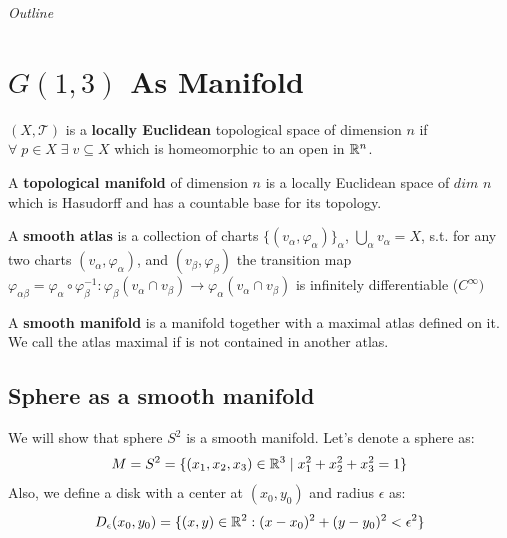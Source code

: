 \documentclass[11pt,a4paper]{report}
\begin{document}
\textit{Outline} \newline







\chapter{$G(1,3)$ As Manifold}
\begin{defn}
     $(X,\mathcal{T})$ is a \textbf{locally Euclidean} topological space of dimension $n$  if $\forall \; p \in X \; \exists \; v \subseteq X$ which is homeomorphic to an open in $\mathbb{R}^n$.
\end{defn}
\begin{defn}
      A \textbf{topological manifold} of dimension $n$ is a locally Euclidean space of $dim$ $n$ which is Hasudorff and has a countable base for its topology.
\end{defn}
\begin{defn}
      A \textbf{smooth atlas} is a collection of charts $\{ (v_{\alpha}, \varphi_{\alpha}) \}_{\alpha}$, $\bigcup_{\alpha} v_{\alpha} = X$, s.t. for any two charts $(v_{\alpha} , \varphi_{\alpha})$, and $(v_{\beta} , \varphi_{\beta})$
      the transition map $\varphi_{\alpha \beta} = \varphi_{\alpha} \circ \varphi_{\beta}^{-1} : \varphi_{\beta}(v_{\alpha} \cap v_{\beta}) \to \varphi_{\alpha}(v_{\alpha} \cap v_{\beta})$ is infinitely differentiable ($C^{\infty})$
\end{defn}
\begin{defn}
  A \textbf{smooth manifold} is a manifold together with a maximal atlas defined on it. We call the atlas maximal if is not contained in another atlas.
\end{defn}
\section{Sphere as a smooth manifold}
We will show that sphere $S^2$ is a smooth manifold. Let's denote a sphere as:
\begin{equation} \label{s2}
 M = S^2 = \{(x_1,x_2,x_3) \in \mathbb{R}^3 \mid x_1^2 + x_2^2 + x_3^2 = 1 \} 
\end{equation}
Also, we define a disk with a center at $(x_0,y_0)$ and radius $\epsilon$ as:
$$ D_{\epsilon}(x_0,y_0) = \{(x,y) \in \mathbb{R}^2 : (x-x_0)^2 + (y-y_0)^2 < \epsilon^2 \} $$
\end{document}
